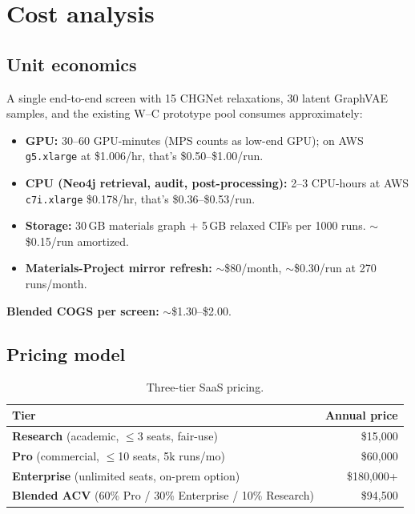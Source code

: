 \documentclass[11pt,a4paper]{report}
\begin{document}
\chapter{Cost analysis}

\section{Unit economics}

A single end-to-end screen with 15 CHGNet relaxations, 30 latent GraphVAE samples, and the
existing W--C prototype pool consumes approximately:
\begin{itemize}[leftmargin=*,itemsep=2pt]
\item \textbf{GPU:} 30--60 GPU-minutes (MPS counts as low-end GPU); on AWS \texttt{g5.xlarge}
      at \$1.006/hr, that's \$0.50--\$1.00/run.
\item \textbf{CPU (Neo4j retrieval, audit, post-processing):} 2--3 CPU-hours at AWS
      \texttt{c7i.xlarge} \$0.178/hr, that's \$0.36--\$0.53/run.
\item \textbf{Storage:} 30\,GB materials graph + 5\,GB relaxed CIFs per 1000 runs.
      $\sim$\$0.15/run amortized.
\item \textbf{Materials-Project mirror refresh:} $\sim$\$80/month, $\sim$\$0.30/run at 270
      runs/month.
\end{itemize}
\textbf{Blended COGS per screen:} $\sim$\$1.30--\$2.00.

\section{Pricing model}

\begin{table}[h]
\centering
\caption{Three-tier SaaS pricing.}
\label{tab:pricing}
\begin{tabular}{lr}
\toprule
\textbf{Tier} & \textbf{Annual price} \\
\midrule
\textbf{Research} (academic, $\leq$3 seats, fair-use) & \$15{,}000 \\
\textbf{Pro} (commercial, $\leq$10 seats, 5k runs/mo) & \$60{,}000 \\
\textbf{Enterprise} (unlimited seats, on-prem option) & \$180{,}000+ \\
\midrule
\textbf{Blended ACV} (60\% Pro / 30\% Enterprise / 10\% Research) & \$94{,}500 \\
\bottomrule
\end{tabular}
\end{table}
\end{document}
